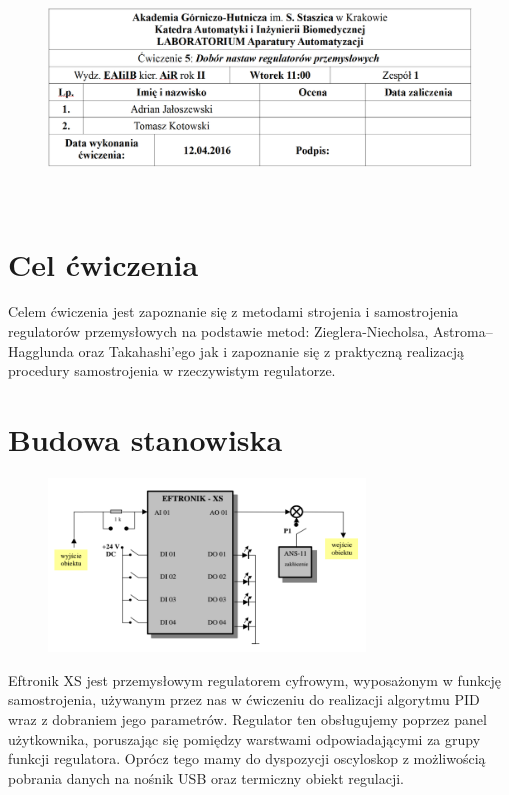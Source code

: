 \documentclass[a4paper, 12pt]{article}
\begin{document}
	\begin{figure}[H]
		\centering
		\includegraphics[height=6cm, width=\textwidth]{./img/Capture.PNG}
	\end{figure}
	\section{Cel ćwiczenia}
		Celem ćwiczenia jest zapoznanie się z metodami strojenia i samostrojenia regulatorów przemysłowych na podstawie metod: Zieglera-Niecholsa, Astroma--Hagglunda oraz Takahashi'ego jak \linebreak i zapoznanie się z praktyczną realizacją procedury samostrojenia w rzeczywistym regulatorze.
	\section{Budowa stanowiska}
		\begin{figure}[H]
			\centering
			\includegraphics[width=0.75\textwidth]{./img/stanowisko.png}
		\end{figure}
		Eftronik XS jest przemysłowym regulatorem cyfrowym, wyposażonym w funkcję samostrojenia, używanym przez nas w ćwiczeniu do realizacji algorytmu PID wraz z dobraniem jego parametrów. Regulator ten obsługujemy poprzez panel użytkownika, poruszając się pomiędzy warstwami odpowiadającymi za grupy funkcji regulatora. Oprócz tego mamy do dyspozycji oscyloskop z możliwością pobrania danych na nośnik USB oraz termiczny obiekt regulacji.
\end{document}

